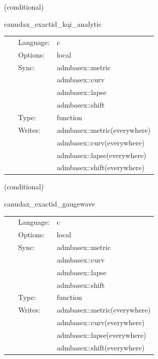 \vspace{5mm}

   (conditional) 

\hspace{5mm} canudax\_exactid\_kqi\_analytic 

\hspace{5mm}{\it create analytic initial data for a kerr bh } 


\hspace{5mm}

 \begin{tabular*}{160mm}{cll} 
~ & Language:  & c \\ 
~ & Options:  & local \\ 
~ & Sync:  & admbasex::metric \\ 
~& ~ &admbasex::curv\\ 
~& ~ &admbasex::lapse\\ 
~& ~ &admbasex::shift\\ 
~ & Type:  & function \\ 
~ & Writes:  & admbasex::metric(everywhere) \\ 
~& ~ &admbasex::curv(everywhere)\\ 
~& ~ &admbasex::lapse(everywhere)\\ 
~& ~ &admbasex::shift(everywhere)\\ 
\end{tabular*} 


\vspace{5mm}

   (conditional) 

\hspace{5mm} canudax\_exactid\_gaugewave 

\hspace{5mm}{\it create gauge wave initial data } 


\hspace{5mm}

 \begin{tabular*}{160mm}{cll} 
~ & Language:  & c \\ 
~ & Options:  & local \\ 
~ & Sync:  & admbasex::metric \\ 
~& ~ &admbasex::curv\\ 
~& ~ &admbasex::lapse\\ 
~& ~ &admbasex::shift\\ 
~ & Type:  & function \\ 
~ & Writes:  & admbasex::metric(everywhere) \\ 
~& ~ &admbasex::curv(everywhere)\\ 
~& ~ &admbasex::lapse(everywhere)\\ 
~& ~ &admbasex::shift(everywhere)\\ 
\end{tabular*} 


